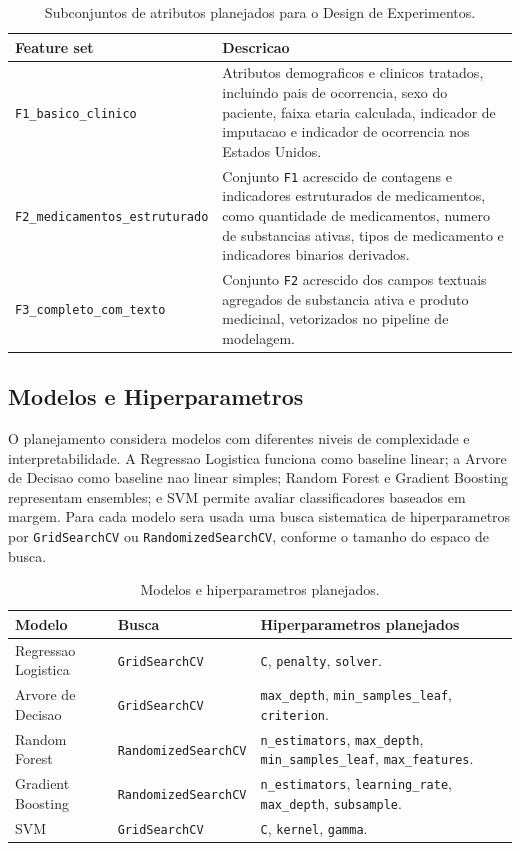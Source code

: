 \begin{table}[htbp]
\centering
\caption{Subconjuntos de atributos planejados para o Design de Experimentos.}
\label{tab:feature_sets_doe}
\begin{tabular}{p{} p{}}
\hline
\textbf{Feature set} & \textbf{Descricao} \\
\hline
\texttt{F1\_basico\_clinico} & Atributos demograficos e clinicos tratados, incluindo pais de ocorrencia, sexo do paciente, faixa etaria calculada, indicador de imputacao e indicador de ocorrencia nos Estados Unidos. \\
\texttt{F2\_medicamentos\_estruturado} & Conjunto \texttt{F1} acrescido de contagens e indicadores estruturados de medicamentos, como quantidade de medicamentos, numero de substancias ativas, tipos de medicamento e indicadores binarios derivados. \\
\texttt{F3\_completo\_com\_texto} & Conjunto \texttt{F2} acrescido dos campos textuais agregados de substancia ativa e produto medicinal, vetorizados no pipeline de modelagem. \\
\hline
\end{tabular}
\end{table}

\subsection{Modelos e Hiperparametros}

O planejamento considera modelos com diferentes niveis de complexidade e interpretabilidade. A Regressao Logistica funciona como baseline linear; a Arvore de Decisao como baseline nao linear simples; Random Forest e Gradient Boosting representam ensembles; e SVM permite avaliar classificadores baseados em margem. Para cada modelo sera usada uma busca sistematica de hiperparametros por \texttt{GridSearchCV} ou \texttt{RandomizedSearchCV}, conforme o tamanho do espaco de busca.

\begin{table}[htbp]
\centering
\caption{Modelos e hiperparametros planejados.}
\label{tab:modelos_hiperparametros_doe}
\begin{tabular}{p{} p{} p{}}
\hline
\textbf{Modelo} & \textbf{Busca} & \textbf{Hiperparametros planejados} \\
\hline
Regressao Logistica & \texttt{GridSearchCV} & \texttt{C}, \texttt{penalty}, \texttt{solver}. \\
Arvore de Decisao & \texttt{GridSearchCV} & \texttt{max\_depth}, \texttt{min\_samples\_leaf}, \texttt{criterion}. \\
Random Forest & \texttt{RandomizedSearchCV} & \texttt{n\_estimators}, \texttt{max\_depth}, \texttt{min\_samples\_leaf}, \texttt{max\_features}. \\
Gradient Boosting & \texttt{RandomizedSearchCV} & \texttt{n\_estimators}, \texttt{learning\_rate}, \texttt{max\_depth}, \texttt{subsample}. \\
SVM & \texttt{GridSearchCV} & \texttt{C}, \texttt{kernel}, \texttt{gamma}. \\
\hline
\end{tabular}
\end{table}

